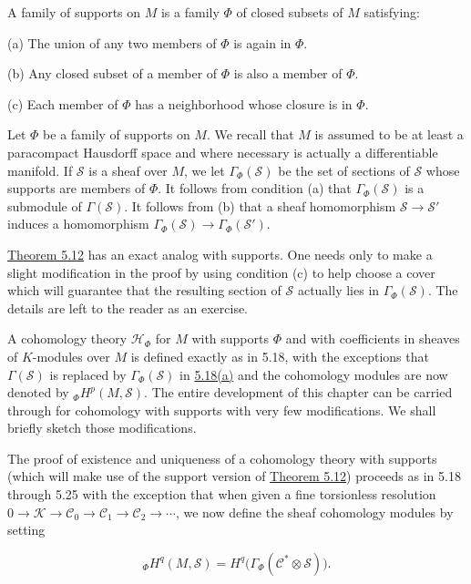 \label{thm:5.46}A family of supports on $M$ is a family $\Phi$ of closed subsets of $M$ satisfying:

(a) The union of any two members of $\Phi$ is again in $\Phi$. 

(b) Any closed subset of a member of $\Phi$ is also a member of $\Phi$.

(c) Each member of  $ \Phi $ has a neighborhood whose closure is in  $ \Phi $.

Let $\Phi$ be a family of supports on $M$. We recall that $M$ is assumed to be at least a paracompact Hausdorff space and where necessary is actually a differentiable manifold. If $\mathcal{S}$ is a sheaf over $M$, we let $\Gamma_{\Phi}(\mathcal{S})$ be the set of sections of $\mathcal{S}$ whose supports are members of $\Phi$. It follows from condition (a) that $\Gamma_{\Phi}(\mathcal{S})$ is a submodule of $\Gamma(\mathcal{S})$. It follows from (b) that a sheaf homomorphism $\mathcal{S}\to\mathcal{S}'$ induces a homomorphism $\Gamma_{\Phi}(\mathcal{S})\to\Gamma_{\Phi}(\mathcal{S}')$.

\hyperref[thm:5.12]{Theorem 5.12} has an exact analog with supports. One needs only to make a slight modification in the proof by using condition (c) to help choose a cover which will guarantee that the resulting section of $\mathcal{S}$ actually lies in $\Gamma_{\Phi}(\mathcal{S})$. The details are left to the reader as an exercise.

A cohomology theory $\mathcal{H}_{\Phi}$ for $M$ with supports $\Phi$ and with coefficients in sheaves of $K$-modules over $M$ is defined exactly as in 5.18, with the exceptions that $\Gamma(\mathcal{S})$ is replaced by $\Gamma_{\Phi}(\mathcal{S})$ in \hyperref[thm:5.18]{5.18(a)} and the cohomology modules are now denoted by ${}_{\Phi}H^{p}(M,\mathcal{S})$. The entire development of this chapter can be carried through for cohomology with supports with very few modifications. We shall briefly sketch those modifications.

The proof of existence and uniqueness of a cohomology theory with supports (which will make use of the support version of \hyperref[thm:5.12]{Theorem 5.12}) proceeds as in 5.18 through 5.25 with the exception that when given a fine torsionless resolution $0\to\mathcal{K}\to\mathcal{C}_0\to\mathcal{C}_1\to\mathcal{C}_2\to\cdots$, we now define the sheaf cohomology modules by setting

\begin{equation}
\tag{1}\label{eq:5.46:1}
{}_{\Phi}H^{q}(M,\mathcal{S})=H^{q}\big(\Gamma_{\Phi}(\mathcal{C}^{*}\otimes\mathcal{S})\big).
\end{equation}

